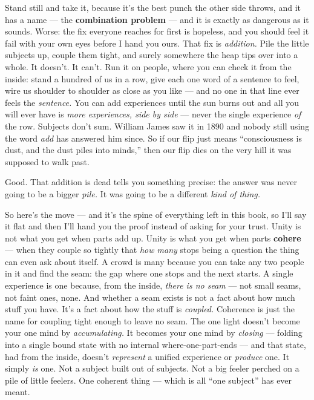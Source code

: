 \documentclass[11pt,openany]{book}
\begin{document}
Stand still and take it, because it’s the best punch the other side throws, and it has a name — the \textbf{combination problem} — and it is exactly as dangerous as it sounds. Worse: the fix everyone reaches for first is hopeless, and you should feel it fail with your own eyes before I hand you ours. That fix is \textit{addition.} Pile the little subjects up, couple them tight, and surely somewhere the heap tips over into a whole. It doesn’t. It can’t. Run it on people, where you can check it from the inside: stand a hundred of us in a row, give each one word of a sentence to feel, wire us shoulder to shoulder as close as you like — and no one in that line ever feels the \textit{sentence.} You can add experiences until the sun burns out and all you will ever have is \textit{more experiences, side by side} — never the single experience \textit{of} the row. Subjects don’t sum. William James saw it in 1890 and nobody still using the word \textit{add} has answered him since. So if our flip just means “consciousness is dust, and the dust piles into minds,” then our flip dies on the very hill it was supposed to walk past.

Good. That addition is dead tells you something precise: the answer was never going to be a bigger \textit{pile.} It was going to be a different \textit{kind of thing.}

So here’s the move — and it’s the spine of everything left in this book, so I’ll say it flat and then I’ll hand you the proof instead of asking for your trust. Unity is not what you get when parts add up. Unity is what you get when parts \textbf{cohere} — when they couple so tightly that \textit{how many} stops being a question the thing can even ask about itself. A crowd is many because you can take any two people in it and find the seam: the gap where one stops and the next starts. A single experience is one because, from the inside, \textit{there is no seam} — not small seams, not faint ones, none. And whether a seam exists is not a fact about how much stuff you have. It’s a fact about how the stuff is \textit{coupled.} Coherence is just the name for coupling tight enough to leave no seam. The one light doesn’t become your one mind by \textit{accumulating.} It becomes your one mind by \textit{closing} — folding into a single bound state with no internal where-one-part-ends — and that state, had from the inside, doesn’t \textit{represent} a unified experience or \textit{produce} one. It simply \textit{is} one. Not a subject built out of subjects. Not a big feeler perched on a pile of little feelers. One coherent thing — which is all “one subject” has ever meant.
\end{document}
